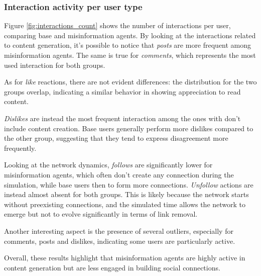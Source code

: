 \subsubsection{Interaction activity per user type}
Figure \ref{fig:interactions_count} shows the number of interactions per user, comparing base and misinformation agents.
By looking at the interactions related to content generation, it's possible to notice that \textit{posts} are more frequent among misinformation agents.
The same is true for \textit{comments}, which represents the most used interaction for both groups.

As for \textit{like} reactions, there are not evident differences: the distribution for the two groups overlap, indicating a similar behavior in showing appreciation to read content.

\textit{Dislikes} are instead the most frequent interaction among the ones with don't include content creation.
Base users generally perform more dislikes compared to the other group, suggesting that they tend to express disagreement more frequently.

Looking at the network dynamics, \textit{follows} are significantly lower for misinformation agents, which often don't create any connection during the simulation, while base users then to form more connections.
\textit{Unfollow} actions are instead almost absent for both groups. This is likely because the network starts without preexisting connections, and the simulated time allows the network to emerge but not to evolve significantly in terms of link removal.

Another interesting aspect is the presence of several outliers, especially for comments, posts and dislikes, indicating some users are particularly active.

Overall, these results highlight that misinformation agents are highly active in content generation but are less engaged in building social connections.


